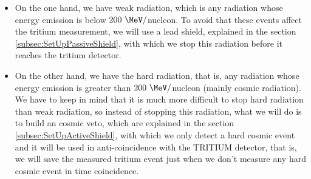 \begin{itemize}

\item{}  On the one hand, we have weak radiation, which is any radiation whose energy emission is below $200~\MeV/$nucleon. To avoid that these events affect the tritium measurement, we will use a lead shield, explained in the section \ref{subsec:SetUpPassiveShield}, with which we stop this radiation before it reaches the tritium detector.

\item{} On the other hand, we have the hard radiation, that is, any radiation whose energy emission is greater than $200~\MeV/$nucleon (mainly cosmic radiation). We have to keep in mind that it is much more difficult to stop hard radiation than weak radiation, so instead of stopping this radiation, what we will do is to build an cosmic veto, which are explained in the section \ref{subsec:SetUpActiveShield}, with which we only detect a hard cosmic event and it will be used in anti-coincidence with the TRITIUM detector, that is, we will save the measured tritium event just when we don't measure any hard cosmic event in time coincidence.

\end{itemize}